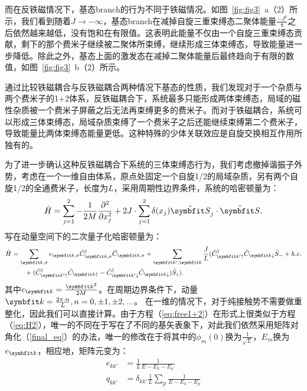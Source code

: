 而在反铁磁情况下，基态branch的行为不同于铁磁情况。如图~\ref{fig:fig3}~a（2）所示，我们看到随着$J\to-\infty$，基态branch在减掉自旋三重束缚态二聚体能量$\frac{-J^2}{8}$之后依然越来越低，没有饱和在有限值。这表明此能量不仅由一个自旋三重束缚态贡献，剩下的那个费米子继续被二聚体所束缚，继续形成三体束缚态，导致能量进一步降低。除此之外，基态上面的激发态在减掉二聚体能量后最终趋向于有限的数值，如图~\ref{fig:fig3}~b（2）所示。

通过比较铁磁耦合与反铁磁耦合两种情况下基态的性质，我们发现对于一个杂质与两个费米子的1+2体系，反铁磁耦合下，系统最多只能形成两体束缚态，局域的磁性杂质被一个费米子屏蔽之后无法再束缚更多的费米子。而对于铁磁耦合，系统可以形成三体束缚态，局域杂质束缚了一个费米子之后还能继续束缚第二个费米子，导致能量比两体束缚态能量更低。这种特殊的少体关联效应是自旋交换相互作用所独有的。

为了进一步确认这种反铁磁耦合下系统的三体束缚态行为，我们考虑撤掉谐振子外势，考虑在一个一维自由体系，原点处固定一个自旋1/2的局域杂质，另有两个自旋1/2的全通费米子，长度为$L$，采用周期性边界条件，系统的哈密顿量为：
\begin{equation}
        \hat{H} = \sum_{j=1}^{2}  -\frac{1}{2M} \frac{\partial^2}{\partial x_{j}^2} + 2J\cdot\sum_{j=1}^2\delta(x_j){\hat{\Vector{S}}}_j\cdot {\hat{\Vector{S}}}.
\end{equation}
写在动量空间下的二次量子化哈密顿量为：
\begin{equation}\label{eq:free1+2}
\begin{split}
        \hat{H} &= \sum_{\Vector{k},\sigma}\epsilon_{\Vector{k},\sigma} \hat{C}^\dagger_{\Vector{k},\sigma} \hat{C}_{\Vector{k},\sigma}  + \sum_{\Vector{k}',\Vector{k}} \frac{J}{L} ( \hat{C}_{\Vector{k}'\uparrow}^\dagger  \hat{C}_{\Vector{k}\downarrow} \hat{S}_- + h.c. \\
        & \quad \quad +   (\hat{C}_{\Vector{k}'\uparrow}^\dagger  \hat{C}_{\Vector{k}\uparrow}-\hat{C}_{\Vector{k}'\downarrow}^\dagger  \hat{C}_{\Vector{k}\downarrow}) \hat{S}_{z} ).
\end{split}
\end{equation}
其中$\epsilon_{\Vector{k}} = \frac{\Vector{k}^2}{2M}$。在周期边界条件下，动量$\Vector{k} = \frac{2\pi\cdot n}{L}, n=0, \pm1, \pm2,...$。
在一维的情况下，对于纯接触势不需要做重整化，因此我们可以直接计算。由于方程（\ref{eq:free1+2}）在形式上很类似于方程（\ref{eq:H2}），唯一的不同在于写在了不同的基矢表象下，对此我们依然采用矩阵对角化（\ref{final_eq}）的办法，唯一的修改在于将其中的$\phi_m(0)$换为$\frac{1}{\sqrt{L}}$，$E_m$换为$\epsilon_{\Vector{k}}$，相应地，矩阵元变为：
\begin{equation}
\begin{split}
e_{kk'} &= \frac{1}{L}\frac{1}{E-E_k-E_{k'}}\\
q_{kk'} &= \delta_{kk'}  \frac{1}{L}\sum_p \frac{1}{E-E_k-E_p}\\
\end{split}
\end{equation}

